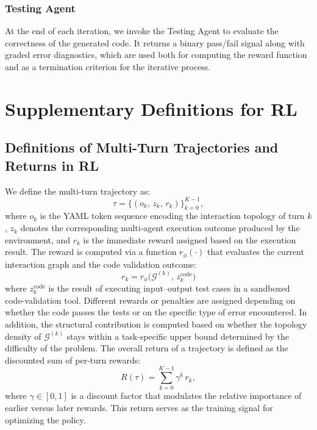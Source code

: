 \documentclass{article}
\theoremstyle{definition}
\begin{document}
\subsubsection{Testing Agent}
At the end of each iteration, we invoke the Testing Agent to evaluate the correctness of the generated code. It returns a binary pass/fail signal along with graded error diagnostics, which are used both for computing the reward function and as a termination criterion for the iterative process.
\section{Supplementary Definitions for RL}
\subsection{Definitions of Multi-Turn Trajectories and Returns in RL}
\label{appendix:Multi-Turn Trajectories}
We define the multi-turn trajectory as: 
\begin{equation}\label{eq:traj}
\tau = \{(o_k,\, z_k,\, r_k)\}_{k=0}^{K-1},
\end{equation}
where $o_k$ is the YAML token sequence encoding the interaction topology of turn $k$, $z_k$ denotes the corresponding multi-agent execution outcome produced by the environment, and $r_k$ is the immediate reward assigned based on the execution result. The reward is computed via a function \(r_\phi(\cdot)\) that evaluates the current interaction graph and the code validation outcome:
\begin{equation}\label{eq:reward}
r_k = r_\phi\!\big(\mathcal{G}^{(k)},\, z_k^{\text{code}}\big)
\end{equation}
where \(z_k^{\text{code}}\) is the result of executing input–output test cases in a sandboxed code-validation tool.
Different rewards or penalties are assigned depending on whether the code passes the tests or on the specific type of error encountered. In addition, the structural contribution is computed based on whether the topology density of $\mathcal{G}^{(k)}$ stays within a task-specific upper bound determined by the difficulty of the problem. 
The overall return of a trajectory is defined as the discounted sum of per-turn rewards:
\begin{equation}\label{eq:return}
R(\tau) = \sum_{k=0}^{K-1} \gamma^k \, r_k,
\end{equation}
where \(\gamma \in [0,1]\) is a discount factor that modulates the relative importance of earlier versus later rewards. This return serves as the training signal for optimizing the policy.
\end{document}

